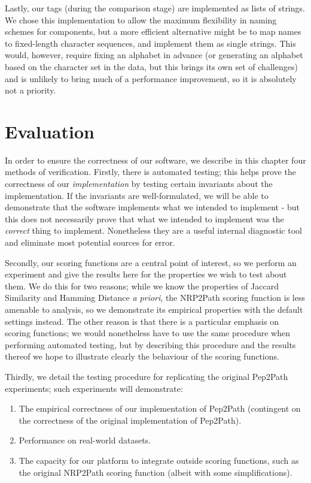 \documentclass{l4proj}
\begin{document}
Lastly, our tags (during the comparison stage) are implemented as lists of strings. We chose this implementation to allow the maximum flexibility in naming schemes for components, but a more efficient alternative might be to map names to fixed-length character sequences, and implement them as single strings. This would, however, require fixing an alphabet in advance (or generating an alphabet based on the character set in the data, but this brings its own set of challenges) and is unlikely to bring much of a performance improvement, so it is absolutely not a priority.

\chapter{Evaluation} 

In order to ensure the correctness of our software, we describe in this chapter four methods of verification. Firstly, there is automated testing; this helps prove the correctness of our \textit{implementation} by testing certain invariants about the implementation. If the invariants are well-formulated, we will be able to demonstrate that the software implements what we intended to implement - but this does not necessarily prove that what we intended to implement was the \textit{correct} thing to implement. Nonetheless they are a useful internal diagnostic tool and eliminate most potential sources for error.

Secondly, our scoring functions are a central point of interest, so we perform an experiment and give the results here for the properties we wish to test about them. We do this for two reasons; while we know the properties of Jaccard Similarity and Hamming Distance \textit{a priori}, the NRP2Path scoring function is less amenable to analysis, so we demonstrate its empirical properties with the default settings instead. The other reason is that there is a particular emphasis on scoring functions; we would nonetheless have to use the same procedure when performing automated testing, but by describing this procedure and the results thereof we hope to illustrate clearly the behaviour of the scoring functions.

Thirdly, we detail the testing procedure for replicating the original Pep2Path experiments; such experiments will demonstrate:
\begin{enumerate}
	\item The empirical correctness of our implementation of Pep2Path (contingent on the correctness of the original implementation of Pep2Path).
	\item Performance on real-world datasets.
	\item The capacity for our platform to integrate outside scoring functions, such as the original NRP2Path scoring function (albeit with some 
		simplifications).
\end{enumerate}
\end{document}
